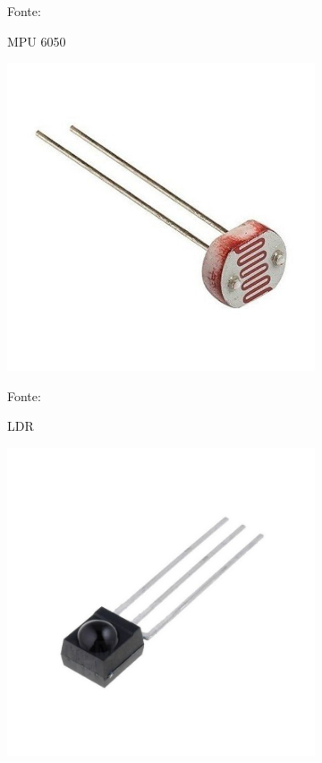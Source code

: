 \begin{figure}[h!]
\begin{subfigure}[b]{0.3\textwidth}
    \caption{MPU 6050} Fonte: \cite{FilipeFlop2019d}
    \label{fig:mpu6050}
  \end{subfigure}
  \begin{subfigure}[b]{0.3\textwidth}
  \centering
    \includegraphics[width=\textwidth]{figuras/ldr.jpg}
    \caption{LDR} Fonte: \cite{EletroGate2019a}
    \label{fig:ldr}
  \end{subfigure}
  \begin{subfigure}[b]{0.3\textwidth}
  \centering
    \includegraphics[width=\textwidth]{figuras/infra.jpg}

\end{subfigure}
\end{figure}
